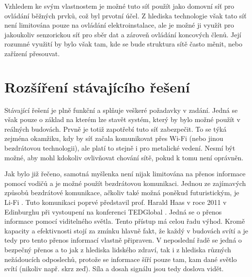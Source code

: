 Vzhledem ke svým vlastnostem je možné tuto síť použít jako domovní síť pro ovládání běžných prvků, což byl prvotní účel. Z hlediska technologie však tato síť není limitována pouze na ovládání elektroinstalace, ale je možné ji využít pro jakoukoliv senzorickou síť pro sběr dat a zároveň ovládání koncových členů. Její rozumné využití by bylo však tam, kde se bude struktura sítě často měnit, nebo zařízení přesouvat.

\chapter{Rozšíření stávajícího řešení}
Stávající řešení je plně funkční a splňuje veškeré požadavky v zadání. Jedná se však pouze o základ na kterém lze stavět systém, který by bylo možné použít v reálných budovách. Prvně je totiž zapotřebí tuto síť zabezpečit. To se týká zejména okamžiku, kdy by síť začala komunikovat přes Wi-Fi  (nebo jinou bezdrátovou technologii), ale platí to stejně i pro metalické vedení. Nesmí být možné, aby mohl kdokoliv ovlivňovat chování sítě, pokud k tomu není oprávněn.

Jak bylo již řečeno, samotná myšlenka není nijak limitována na přenos informace pomocí vodičů a je možné použít bezdrátovou komunikaci. Jednou ze zajímavých způsobů bezdrátové komunikace, ačkoliv také možná poněkud futuristickým, je Li-Fi \cite{lifi}.  Tuto komunikaci poprvé představil prof. Harald Haas v roce 2011 v Edinburghu při vystoupení na konferenci TEDGlobal \cite{ted}. Jedná se o přenos informace pomocí viditelného světla. Tento přístup má celou řadu výhod. Kromě kapacity a efektivnosti stojí za zmínku hlavně fakt, že každý v budovách svítí a je tedy pro tento přenos informací vlastně připraven. V neposlední řadě se jedná o bezpečný přenos a to jak z hlediska lidského zdraví, tak i z hlediska různých nežádoucích odposlechů, protože se informace šíří pouze tam, kam dané světlo svítí (nikoliv např. skrz zeď). Síla a dosah signálu jsou tedy doslova vidět.


